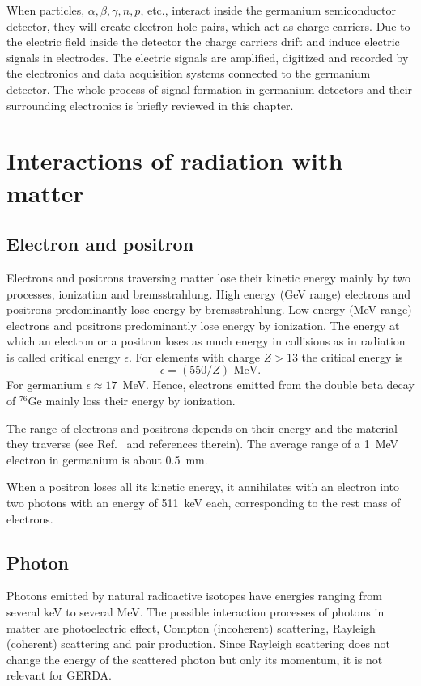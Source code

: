 When particles, $\alpha, \beta, \gamma, n, p$, etc., interact inside the germanium semiconductor detector, they will create electron-hole pairs, which act as charge carriers. Due to the electric field inside the detector the charge carriers drift and induce electric signals in electrodes. The electric signals are amplified, digitized and recorded by the electronics and data acquisition systems connected to the germanium detector. The whole process of signal formation in germanium detectors and their surrounding electronics is briefly reviewed in this chapter.

\section{Interactions of radiation with matter}
\label{sec:det:phys}
\subsection{Electron and positron}
\label{sec:det:ep}
Electrons and positrons traversing matter lose their kinetic energy mainly by two processes, ionization and bremsstrahlung. High energy (GeV range) electrons and positrons predominantly lose energy by bremsstrahlung. Low energy (MeV range) electrons and positrons predominantly lose energy by ionization. The energy at which an electron or a positron loses as much energy in collisions as in radiation is called critical energy $\epsilon$. For elements with charge $Z > 13$ the critical energy is~\cite{Ama81}
\begin{equation}
  \label{eq:det:ecrit}
  \epsilon = (550/Z) \text{ MeV}.
\end{equation}
For germanium $\epsilon \approx 17$~MeV. Hence, electrons emitted from the double beta decay of $^{76}$Ge mainly loss their energy by ionization.

The range of electrons and positrons depends on their energy and the material they traverse (see Ref.~\cite{Bri84} and references therein). The average range of a 1~MeV electron in germanium is about 0.5~mm.

When a positron loses all its kinetic energy, it annihilates with an electron into two photons with an energy of 511~keV each, corresponding to the rest mass of electrons.

\subsection{Photon}
\label{sec:det:gamma}
Photons emitted by natural radioactive isotopes have energies ranging from several keV to several MeV. The possible interaction processes of photons in matter are photoelectric effect, Compton (incoherent) scattering, Rayleigh (coherent) scattering and pair production. Since Rayleigh scattering does not change the energy of the scattered photon but only its momentum, it is not relevant for GERDA.

